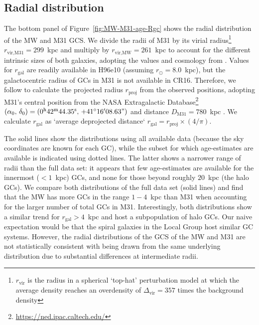 \documentclass[a4paper,fleqn,usenatbib]{mnras}
\begin{document}
\subsection{Radial distribution}
\label{sec:Rgc}
The bottom panel of Figure~\ref{fig:MW-M31-age-Rgc} shows the radial distribution
of the MW and M31 GCS. We divide the radii of M31 by its virial radius\footnote{
$r_{\text{vir}}$ is the radius in a spherical `top-hat' perturbation model at which
the average density reaches an overdensity of $\Delta_{\text{vir}}=357$ times the 
background density} $r_{\text{vir,M31}} = 299$~kpc and multiply by 
$r_{\text{vir,MW}} = 261$~kpc to account for the different intrinsic sizes of both 
galaxies, adopting the values and cosmology from \citet{2017MNRAS.464.3825P}.
Values for $r_{\text{gal}}$ are readily available in H96e10 (assuming $r_{\odot}=8.0$~kpc), 
but the galactocentric radius of GCs in M31 is not available in CR16. Therefore, we 
follow \citet[][section~4.1]{2019arXiv190111229W} 
to calculate the projected radius $r_{\text{proj}}$ from the observed positions,
adopting M31's central position from the NASA Extragalactic 
Database\footnote{\url{https://ned.ipac.caltech.edu/}} $(\alpha_0, \, \delta_0) =
(0^{\text{h}}42^{\text{m}}44.35^{\text{s}}, \, +41^{\circ}16'08.63")$
and distance $D_{\text{M31}} = 780$~kpc \citep{2005MNRAS.356..979M,2012ApJ...758...11C}.
We calculate $r_{\text{gal}}$ as `average deprojected distance`
$r_{\text{gal}} = r_{\text{proj}} \times (4/\pi)$. 

The solid lines show the distributions using all available data (because the
sky coordinates are known for each GC), while the subset for which age-estimates
are available is indicated using dotted lines. The latter shows a narrower range
of radii than the full data set: it appears that few age-estimates are available 
for the innermost ($<1$~kpc) GCs, and none for those beyond roughly $20$~kpc
(the halo GCs). We compare both distributions of the full data set (solid 
lines) and find that the MW has more GCs in the range $1-4$~kpc than M31
when accounting for the larger number of total GCs in M31. Interestingly, both
distributions show a similar trend for $r_{\text{gal}} > 4$~kpc and host a 
subpopulation of halo GCs. Our naive expectation would be that the spiral galaxies
in the Local Group host similar GC systems. However, the radial distributions of
the GCS of the MW and M31 are not statistically consistent with being drawn from 
the same underlying distribution due to substantial differences at intermediate radii. 
\end{document}
